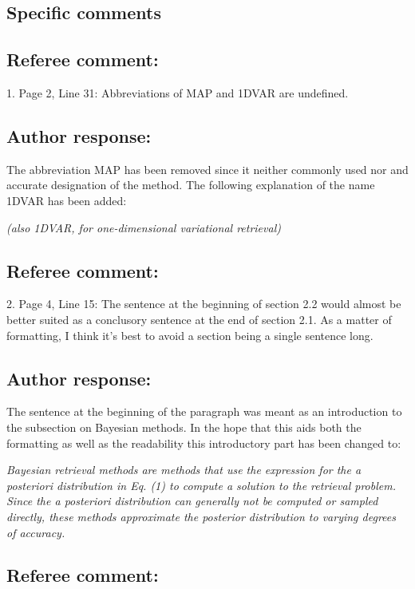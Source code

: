 \documentclass[journal abbreviation, manuscript]{copernicus}
\begin{document}
\subsection{Specific comments}

\subsection*{Referee comment:}

1. Page 2, Line 31: Abbreviations of MAP and 1DVAR are undefined.

\subsection*{Author response:}

The abbreviation MAP has been removed since it neither commonly used nor
and accurate designation of the method. The following explanation of the
name 1DVAR has been added:

\vspace{0.5em}
\textit{(also 1DVAR, for one-dimensional variational retrieval)}

\subsection*{Referee comment:}
2. Page 4, Line 15: The sentence at the beginning of section 2.2 would almost be better
suited as a conclusory sentence at the end of section 2.1. As a matter of formatting, I
think it’s best to avoid a section being a single sentence long.

\subsection*{Author response:}

The sentence at the beginning of the paragraph was meant as an introduction to the
subsection on Bayesian methods. In the hope that this aids both the formatting as
well as the readability this introductory part has been changed to:


\vspace{1em}
\textit{
Bayesian retrieval methods are methods that use the expression for the a
posteriori distribution in Eq. (1) to compute a solution to the
retrieval problem. Since the a posteriori distribution can generally not be
computed or sampled directly, these methods approximate the posterior
distribution to varying degrees of accuracy.}

\subsection*{Referee comment:}
\end{document}
